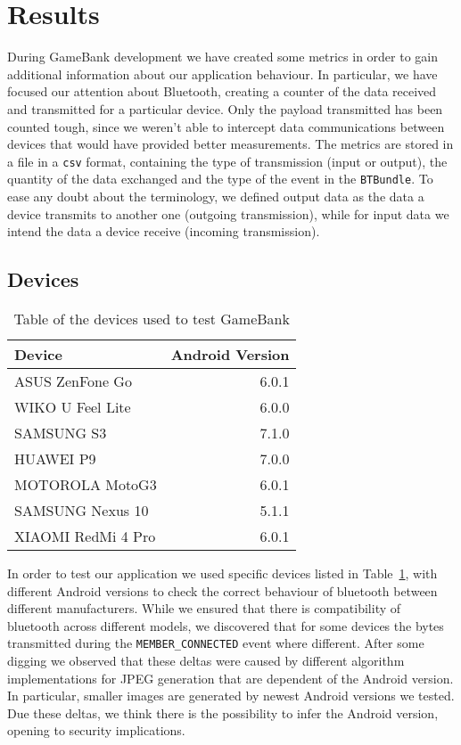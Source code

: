 \section{Results}

During GameBank development we have created some metrics in order to gain 
additional information about our application behaviour. In particular, we 
have focused our attention about Bluetooth, creating a counter of the data 
received and transmitted for a particular device. Only the payload transmitted 
has been counted tough, since we weren't able to intercept data communications 
between devices that would have provided better measurements. The metrics are 
stored in a file in a \texttt{csv} format, containing the type of transmission 
(input or output), the quantity of the data exchanged and the type of the 
event in the \texttt{BTBundle}. To ease any doubt about the terminology, we 
defined output data as the data a device transmits to another one (outgoing 
transmission), while for input data we intend the data a device receive 
(incoming transmission).

\subsection{Devices}

\begin{table}[t]
 \centering
 \caption{Table of the devices used to test GameBank}
 \label{tab:res:lod}
 \begin{tabular}{l r}
  \textbf{Device} & \textbf{Android Version} \\ \toprule
  ASUS ZenFone Go & 6.0.1 \\
  WIKO U Feel Lite & 6.0.0 \\
  SAMSUNG S3 & 7.1.0 \\
  HUAWEI P9 & 7.0.0 \\
  MOTOROLA MotoG3 & 6.0.1 \\
  SAMSUNG Nexus 10 & 5.1.1 \\
  XIAOMI RedMi 4 Pro & 6.0.1
 \end{tabular}
\end{table}

In order to test our application we used specific devices listed in 
Table~\ref{tab:res:lod}, with different Android versions to check the correct 
behaviour of bluetooth between different manufacturers. While we ensured that 
there is compatibility of bluetooth across different models, we discovered that 
for some devices the bytes transmitted during the \texttt{MEMBER\_CONNECTED} 
event where different. After some digging we observed that these deltas were 
caused by different algorithm implementations for JPEG generation that are 
dependent of the Android version. In particular, smaller images are generated 
by newest Android versions we tested. Due these deltas, we think there is the 
possibility to infer the Android version, opening to security implications.

